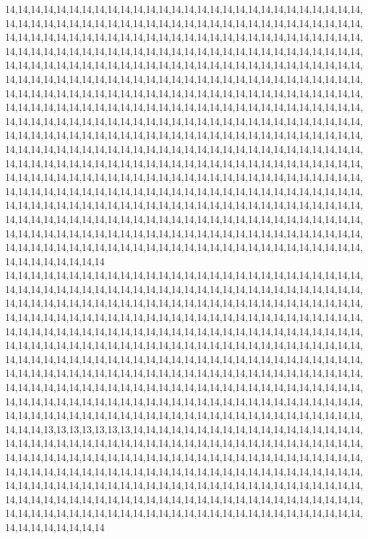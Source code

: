 14,14,14,14,14,14,14,14,14,14,14,14,14,14,14,14,14,14,14,14,14,14,14,14,14,14,14,14,14,14,14,14,14,14,14,14,14,14,14,14,14,14,14,14,14,14,14,14,14,14,14,14,14,14,14,14,14,14,14,14,14,14,14,14,14,14,14,14,14,14,14,14,14,14,14,14,14,14,14,14,14,14,14,14,14,14,14,14,14,14,14,14,14,14,14,14,14,14,14,14,14,14,14,14,14,14,14,14,14,14,14,14,14,14,14,14,14,14,14,14,14,14,14,14,14,14,14,14,14,14,14,14,14,14,14,14,14,14,14,14,14,14,14,14,14,14,14,14,14,14,14,14,14,14,14,14,14,14,14,14,14,14,14,14,14,14,14,14,14,14,14,14,14,14,14,14,14,14,14,14,14,14,14,14,14,14,14,14,14,14,14,14,14,14,14,14,14,14,14,14,14,14,14,14,14,14,14,14,14,14,14,14,14,14,14,14,14,14,14,14,14,14,14,14,14,14,14,14,14,14,14,14,14,14,14,14,14,14,14,14,14,14,14,14,14,14,14,14,14,14,14,14,14,14,14,14,14,14,14,14,14,14,14,14,14,14,14,14,14,14,14,14,14,14,14,14,14,14,14,14,14,14,14,14,14,14,14,14,14,14,14,14,14,14,14,14,14,14,14,14,14,14,14,14,14,14,14,14,14,14,14,14,14,14,14,14,14,14,14,14,14,14,14,14,14,14,14,14,14,14,14,14,14,14,14,14,14,14,14,14,14,14,14,14,14,14,14,14,14,14,14,14,14,14,14,14,14,14,14,14,14,14,14,14,14,14,14,14,14,14,14,14,14,14,14,14,14,14,14,14,14,14,14,14,14,14,14,14,14,14,14,14,14,14,14,14,14,14,14,14,14,14,14,14,14,14,14,14,14,14,14,14,14,14,14,14,14,14,14,14,14,14,14,14,14,14,14,14,14,14,14,14,14,14,14,14,14,14,14,14,14,14,14,14,14,14,14,14,14,14,14,14,14,14,14,14,14,14,14,14,14,14,14,14,14,14,14,14,14,14,14,14,14,14,14,14,14,14,14,14,14,14,14,14,14,14,14,14,14,14,14,14,14,14,14,14,14,14,14,14,14,14,14,14,14,14,14,14,14,14,14,14
14,14,14,14,14,14,14,14,14,14,14,14,14,14,14,14,14,14,14,14,14,14,14,14,14,14,14,14,14,14,14,14,14,14,14,14,14,14,14,14,14,14,14,14,14,14,14,14,14,14,14,14,14,14,14,14,14,14,14,14,14,14,14,14,14,14,14,14,14,14,14,14,14,14,14,14,14,14,14,14,14,14,14,14,14,14,14,14,14,14,14,14,14,14,14,14,14,14,14,14,14,14,14,14,14,14,14,14,14,14,14,14,14,14,14,14,14,14,14,14,14,14,14,14,14,14,14,14,14,14,14,14,14,14,14,14,14,14,14,14,14,14,14,14,14,14,14,14,14,14,14,14,14,14,14,14,14,14,14,14,14,14,14,14,14,14,14,14,14,14,14,14,14,14,14,14,14,14,14,14,14,14,14,14,14,14,14,14,14,14,14,14,14,14,14,14,14,14,14,14,14,14,14,14,14,14,14,14,14,14,14,14,14,14,14,14,14,14,14,14,14,14,14,14,14,14,14,14,14,14,14,14,14,14,14,14,14,14,14,14,14,14,14,14,14,14,14,14,14,14,14,14,14,14,14,14,14,14,14,14,14,14,14,14,14,14,14,14,14,14,14,14,14,14,14,14,14,14,14,14,14,14,14,14,14,14,14,14,14,14,14,14,14,14,14,14,14,14,14,14,14,14,14,14,14,14,14,14,14,14,14,13,13,13,13,13,13,13,14,14,14,14,14,14,14,14,14,14,14,14,14,14,14,14,14,14,14,14,14,14,14,14,14,14,14,14,14,14,14,14,14,14,14,14,14,14,14,14,14,14,14,14,14,14,14,14,14,14,14,14,14,14,14,14,14,14,14,14,14,14,14,14,14,14,14,14,14,14,14,14,14,14,14,14,14,14,14,14,14,14,14,14,14,14,14,14,14,14,14,14,14,14,14,14,14,14,14,14,14,14,14,14,14,14,14,14,14,14,14,14,14,14,14,14,14,14,14,14,14,14,14,14,14,14,14,14,14,14,14,14,14,14,14,14,14,14,14,14,14,14,14,14,14,14,14,14,14,14,14,14,14,14,14,14,14,14,14,14,14,14,14,14,14,14,14,14,14,14,14,14,14,14,14,14,14,14,14,14,14,14,14,14,14,14,14,14,14,14,14,14,14,14
